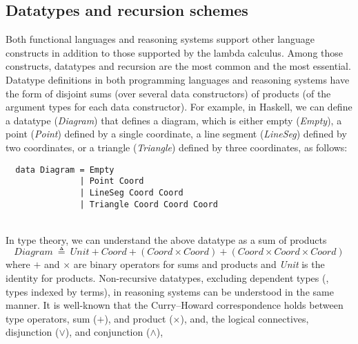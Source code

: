 \subsection{Datatypes and recursion schemes}
\label{ssec:intro:scope:datarec}
Both functional languages and reasoning systems support other
language constructs in addition to those supported by the lambda calculus.
Among those constructs, datatypes and recursion are the most common and
the most essential. Datatype definitions in both programming languages and
reasoning systems have the form of disjoint sums (over several data
constructors) of products (of the argument types for each data constructor).
For example, in Haskell, we can define a datatype (\textit{Diagram})
that defines a diagram, which is either empty (\textit{Empty}),
a point (\textit{Point}) defined by a single coordinate,
a line segment (\textit{LineSeg}) defined by two coordinates, or
a triangle (\textit{Triangle}) defined by three coordinates, as follows:
\vspace*{-2em}
\begin{singlespace}
\begin{verbatim}
  data Diagram = Empty
               | Point Coord
               | LineSeg Coord Coord
               | Triangle Coord Coord Coord
\end{verbatim}
\end{singlespace}~\vspace*{-2.5em}\\
In type theory, we can understand the above datatype as a sum of products
\[ \textit{Diagram} ~ \triangleq ~
        \textit{Unit} + \textit{Coord} + (\textit{Coord} \times \textit{Coord})
        + (\textit{Coord} \times \textit{Coord} \times \textit{Coord}) \]
where $+$ and $\times$ are binary operators for sums and products and
\textit{Unit} is the identity for products. Non-recursive datatypes, excluding
dependent types (\ie, types indexed by terms), in reasoning systems can be
understood in the same manner.
It is well-known that the Curry--Howard correspondence holds between
type operators, sum ($+$), and product ($\times$), and,
the logical connectives, disjunction ($\lor$), and conjunction ($\land$),

